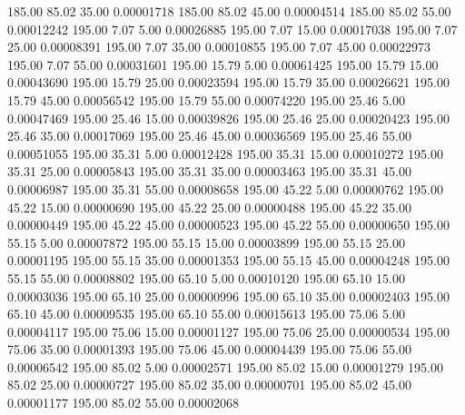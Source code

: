     185.00     85.02     35.00     0.00001718
    185.00     85.02     45.00     0.00004514
    185.00     85.02     55.00     0.00012242
    195.00      7.07      5.00     0.00026885
    195.00      7.07     15.00     0.00017038
    195.00      7.07     25.00     0.00008391
    195.00      7.07     35.00     0.00010855
    195.00      7.07     45.00     0.00022973
    195.00      7.07     55.00     0.00031601
    195.00     15.79      5.00     0.00061425
    195.00     15.79     15.00     0.00043690
    195.00     15.79     25.00     0.00023594
    195.00     15.79     35.00     0.00026621
    195.00     15.79     45.00     0.00056542
    195.00     15.79     55.00     0.00074220
    195.00     25.46      5.00     0.00047469
    195.00     25.46     15.00     0.00039826
    195.00     25.46     25.00     0.00020423
    195.00     25.46     35.00     0.00017069
    195.00     25.46     45.00     0.00036569
    195.00     25.46     55.00     0.00051055
    195.00     35.31      5.00     0.00012428
    195.00     35.31     15.00     0.00010272
    195.00     35.31     25.00     0.00005843
    195.00     35.31     35.00     0.00003463
    195.00     35.31     45.00     0.00006987
    195.00     35.31     55.00     0.00008658
    195.00     45.22      5.00     0.00000762
    195.00     45.22     15.00     0.00000690
    195.00     45.22     25.00     0.00000488
    195.00     45.22     35.00     0.00000449
    195.00     45.22     45.00     0.00000523
    195.00     45.22     55.00     0.00000650
    195.00     55.15      5.00     0.00007872
    195.00     55.15     15.00     0.00003899
    195.00     55.15     25.00     0.00001195
    195.00     55.15     35.00     0.00001353
    195.00     55.15     45.00     0.00004248
    195.00     55.15     55.00     0.00008802
    195.00     65.10      5.00     0.00010120
    195.00     65.10     15.00     0.00003036
    195.00     65.10     25.00     0.00000996
    195.00     65.10     35.00     0.00002403
    195.00     65.10     45.00     0.00009535
    195.00     65.10     55.00     0.00015613
    195.00     75.06      5.00     0.00004117
    195.00     75.06     15.00     0.00001127
    195.00     75.06     25.00     0.00000534
    195.00     75.06     35.00     0.00001393
    195.00     75.06     45.00     0.00004439
    195.00     75.06     55.00     0.00006542
    195.00     85.02      5.00     0.00002571
    195.00     85.02     15.00     0.00001279
    195.00     85.02     25.00     0.00000727
    195.00     85.02     35.00     0.00000701
    195.00     85.02     45.00     0.00001177
    195.00     85.02     55.00     0.00002068
